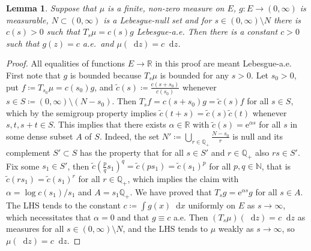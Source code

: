 \documentclass[reqno,draft]{amsart}
\numberwithin{equation}{section}
\theoremstyle{plain}
\newtheorem{lemma}[theorem]{Lemma}
\theoremstyle{remark}
\newcommand{\R}{\mathbb{R}} %
\newcommand{\Q}{\mathbb{Q}} %
\newcommand{\N}{\mathbb{N}} %
\newcommand*\diff{\mathop{}\!\mathrm{d}}
\newcommand{\e}{\mathrm{e}}
\begin{document}
\begin{lemma}\label{lem:Tsmu}
    Suppose that $\mu$ is a finite, non-zero measure on $E$, $g \colon E\to (0,\infty)$ is measurable, $N \subset (0,\infty)$ is a Lebesgue-null set and for $s \in (0,\infty)\setminus N$ there is $c(s) > 0$ such that $T_s \mu = c(s) g$ Lebesgue-a.e. Then there is a constant $c > 0$ such that $g(z) = c$ a.e.\ and $\mu(\diff z) = c \diff z$.
\end{lemma}
\begin{proof}
    All equalities of functions $E\to \R$ in this proof are meant Lebesgue-a.e. First note that $g$ is bounded because $T_s\mu$ is bounded for any $s > 0$. Let $s_0 > 0$, put $f\coloneqq T_{s_0} \mu = c(s_0) g$, and $\widetilde{c}(s) \coloneqq \frac{c(s+s_0)}{c(s_0)}$ whenever $s \in S\coloneqq  (0,\infty)\setminus (N-s_0) $. Then $T_s f = c(s+s_0) g = \widetilde{c}(s) f$ for all $s \in S$, which by the semigroup property implies $\widetilde{c}(t+s) = \widetilde{c}(s) \widetilde{c}(t)$ whenever $s,t,s+t\in S$. This implies that there exists $\alpha \in \R$ with $\widetilde{c}(s) = \e^{\alpha s}$ for all $s$ in some dense subset $A$ of $S$. Indeed, the set $N' \coloneqq \bigcup_{r\in \Q_+} \frac{N-s_0}{r}$ is null and its complement $S'\subset S$ has the property that for all $s\in S'$ and $r\in \Q_+$ also $rs \in S'$. Fix some $s_1\in S'$, then $\widetilde{c}(\frac{p}{q}s_1)^q = \widetilde{c}(ps_1) = \widetilde{c}(s_1)^p$ for all $p,q\in \N$, that is $\widetilde{c}(rs_1) = \widetilde{c}(s_1)^r$ for all $r\in \Q_+$, which implies the claim with $\alpha = \log c(s_1)/s_1$ and $A = s_1\Q_+$. We have proved that $T_s g = \e^{\alpha s}g$ for all $s\in A$. %
    The LHS tends to the constant $c\coloneqq \int g(x) \diff x$ uniformly on $E$ as $s \to \infty$, which necessitates that $\alpha = 0$ and that $g\equiv c$ a.e. Then $(T_s \mu)(\diff z) = c \diff z$ as measures for all $s\in (0,\infty)\setminus N$, and the LHS tends to $\mu$ weakly as $s \to \infty$, so $\mu(\diff z) = c \diff z$.
\end{proof}

\end{document}
